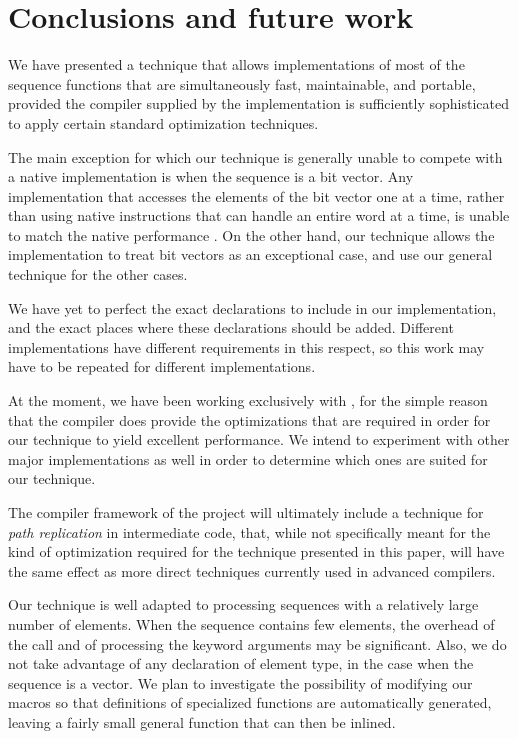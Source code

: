 \section{Conclusions and future work}

We have presented a technique that allows implementations of most of
the \commonlisp{} sequence functions that are simultaneously fast,
maintainable, and portable, provided the compiler supplied by the
implementation is sufficiently sophisticated to apply certain standard
optimization techniques.

The main exception for which our technique is generally unable to
compete with a native implementation is when the sequence is a bit
vector.  Any implementation that accesses the elements of the bit
vector one at a time, rather than using native instructions that can
handle an entire word at a time, is unable to match the native
performance \cite{Baker:1990:EIB:121989.121991}.  On the other hand,
our technique allows the \commonlisp{} implementation to treat bit
vectors as an exceptional case, and use our general technique for the
other cases.

We have yet to perfect the exact declarations to include in our
implementation, and the exact places where these declarations should
be added.  Different \commonlisp{} implementations have different
requirements in this respect, so this work may have to be repeated for
different implementations.

At the moment, we have been working exclusively with \sbcl{}, for the
simple reason that the \sbcl{} compiler does provide the optimizations
that are required in order for our technique to yield excellent
performance.  We intend to experiment with other major implementations
as well in order to determine which ones are suited for our
technique.

The \cleavir{} compiler framework of the \sicl{} project will
ultimately include a technique for \emph{path replication} in
intermediate code, that, while not specifically meant for the kind of
optimization required for the technique presented in this paper, will
have the same effect as more direct techniques currently used in
advanced compilers.

Our technique is well adapted to processing sequences with a
relatively large number of elements.  When the sequence contains few
elements, the overhead of the call and of processing the keyword
arguments may be significant.  Also, we do not take advantage of any
declaration of element type, in the case when the sequence is a
vector.  We plan to investigate the possibility of modifying our
macros so that definitions of specialized functions are automatically
generated, leaving a fairly small general function that can then be
inlined.
